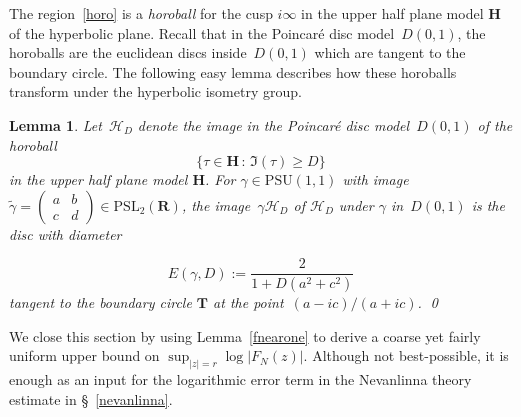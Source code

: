\documentclass[10pt]{amsart}
\def\PSL{\mathrm{PSL}}
\def\SSSS{\S}
\def\HH{\mathcal{H}}
\def\PSU{\mathrm{PSU}}
\def\T{\mathbf{T}}
\def\R{\mathbf{R}}
\newtheorem{lemma}[subsubsection]{Lemma}
\theoremstyle{remark}
\numberwithin{equation}{subsection}
\def\numequation{\addtocounter{subsubsection}{1}\begin{equation}}
\def\H{\mathbf{H}}
\begin{document}
The region~\eqref{horo} is a \emph{horoball} for the cusp $i\infty$ in the upper half plane model $\H$ of the hyperbolic plane. Recall that in the Poincar\'{e} disc model~$D(0,1)$, the horoballs are the euclidean discs inside~$D(0,1)$ which are tangent to the boundary circle. The following easy lemma describes how these horoballs transform under the hyperbolic isometry group. 

\begin{lemma} \label{translates} Let~$\HH_D$ denote the image in the Poincar\'e disc model~$D(0,1)$ of the horoball
$$
\{  \tau \in \H \, : \, \Im(\tau) \ge D \}
$$
in the upper half plane model $\H$. 
  For $\gamma\in \PSU(1,1)$ with image $\widetilde{\gamma}=\begin{pmatrix} a & b \\ c & d \end{pmatrix} \in \PSL_2(\R)$, 
the image~$\gamma \HH_D$ of $\HH_D$ under $\gamma$ in~$D(0,1)$ is the disc with diameter
\numequation
E(\gamma,D):=\frac{2}{1 + D(a^2 + c^2)}
\end{equation}
tangent to the boundary circle $\T$ at the point~$(a - i c)/(a + i c)$.   \qed
\end{lemma}


We  close this section by using Lemma~\ref{fnearone} to derive
 a coarse yet fairly uniform upper bound on $\sup_{|z|=r} \log |F_N(z)|$. Although  not best-possible, it  is enough as an input for the logarithmic error term in the Nevanlinna theory estimate in \SSSS~\ref{nevanlinna}.
\end{document}
